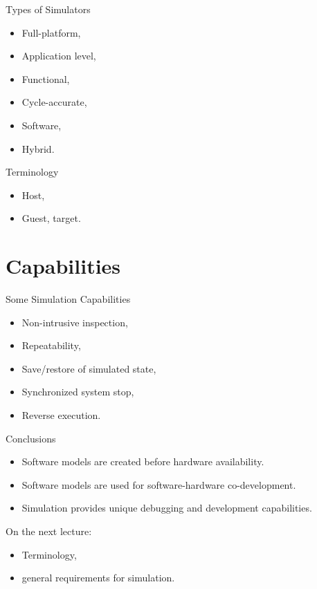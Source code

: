 \begin{frame}{Types of Simulators}
\begin{itemize}
\item Full-platform,
\item Application level,
\item Functional,
\item Cycle-accurate,
\item Software,
\item Hybrid.
\end{itemize}
\end{frame}

\begin{frame} {Terminology}
\begin{itemize}
\item Host,
\item Guest, target.
\end{itemize}
\end{frame}

\section{Capabilities}

\begin{frame}{Some Simulation Capabilities}
\begin{itemize}
\item Non-intrusive inspection,
\item Repeatability,
\item Save/restore of simulated state,
\item Synchronized system stop,
\item Reverse execution.
\end{itemize}
\end{frame}

\begin{frame}{Conclusions}
\begin{itemize}
\item Software models are created before hardware availability.
\item Software models are used for software-hardware co-development.
\item Simulation provides unique debugging and development capabilities.
\end{itemize}
\end{frame}

\begin{frame}{On the next lecture:}
\begin{itemize}
\item Terminology,
\item general requirements for simulation.
\end{itemize}
\end{frame}

